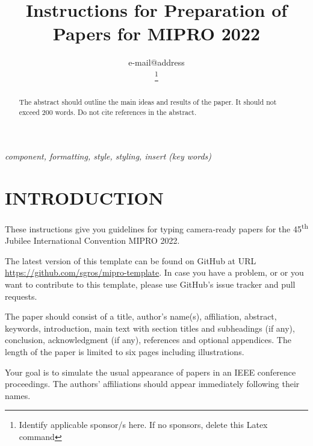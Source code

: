 \documentclass{MIPRO}
\begin{document}
\title{Instructions for Preparation of Papers for MIPRO 2022}

\author{



e-mail@address

\thanks{Identify applicable sponsor/s here. If no sponsors, delete this Latex command}
}

\maketitle

\begin{abstract}
The abstract should outline the main ideas and results of the paper. It should not exceed 200 words. Do not cite references in the abstract. 
\end{abstract}

\renewcommand\IEEEkeywordsname{Keywords}
\begin{IEEEkeywords}
\textit{component, formatting, style, styling, insert (key words)}
\end{IEEEkeywords}

\section{INTRODUCTION}

These instructions give you guidelines for typing camera‑ready papers for the 45\textsuperscript{th} Jubilee International Convention MIPRO 2022.

The latest version of this template can be found on GitHub at URL \url{https://github.com/sgros/mipro-template}. In case you have a problem, or or you want to contribute to this template, please use GitHub's issue tracker and pull requests.

The paper should consist of a title, author's name(s), affiliation, abstract, keywords, introduction, main text with section titles and subheadings (if any), conclusion, acknowledgment (if any), references and optional appendices. The length of the paper is limited to six pages including illustrations.

Your goal is to simulate the usual appearance of papers in an IEEE conference proceedings. The authors' affiliations should appear immediately following their names.
\end{document}
